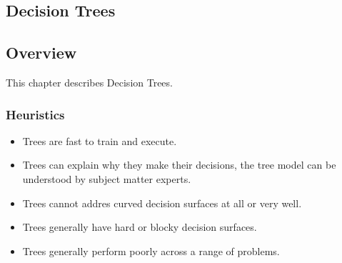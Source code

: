 

\renewcommand{\bibsection}{\subsection{\bibname}}
\begin{bibunit}

\chapter{Decision Trees}
\label{ch:trees}

\section{Overview}
This chapter describes Decision Trees.


\subsection{Heuristics}

\begin{itemize}
	\item Trees are fast to train and execute.
	\item Trees can explain why they make their decisions, the tree model can be understood by subject matter experts.
	\item Trees cannot addres curved decision surfaces at all or very well.
	\item Trees generally have hard or blocky decision surfaces.
	\item Trees generally perform poorly across a range of problems.
\end{itemize}


\putbib
\end{bibunit}


\newpage\begin{bibunit}\putbib\end{bibunit}
\newpage\begin{bibunit}\putbib\end{bibunit}
